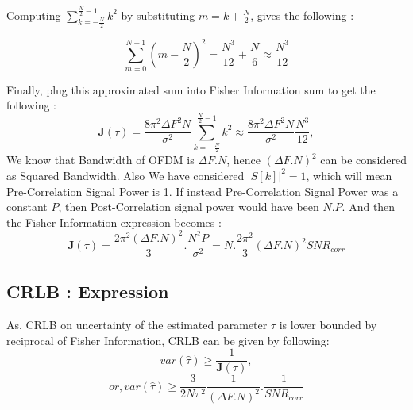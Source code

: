 \documentclass{article}
\begin{document}
Computing $\sum^{\frac{N}{2} - 1}_{k=-\frac{N}{2}}k^2$ by substituting $m=k+\frac{N}{2}$, gives the following :

$$\sum^{N-1}_{m=0}(m-\frac{N}{2})^2 = \frac{N^3}{12} + \frac{N}{6} \approx \frac{N^3}{12}$$

Finally, plug this approximated sum into Fisher Information sum to get the following :
$$\mathbf{J}(\tau) = \frac{8\pi^2 \Delta F^2 N}{\sigma^2}\sum^{\frac{N}{2} - 1}_{k=-\frac{N}{2}}k^2 \approx \frac{8\pi^2 \Delta F^2 N}{\sigma^2} \frac{N^3}{12},$$
We know that Bandwidth of OFDM is $\Delta F.N$, hence $(\Delta F . N)^2$ can be considered as Squared Bandwidth. Also We have considered $|S[k]|^2 = 1$, which will mean Pre-Correlation Signal Power is 1. If instead Pre-Correlation Signal Power was a constant $P$, then Post-Correlation signal power would have been $N.P$. And then the Fisher Information expression becomes :
$$\mathbf{J}(\tau) = \frac{2\pi^2 (\Delta F.N)^2}{3}. \frac{N^2 P}{\sigma^2} = N. \frac{2\pi^2}{3} (\Delta F.N)^2 SNR_{corr}$$

\subsection{CRLB : Expression}
As, CRLB on uncertainty of the estimated parameter $\tau$ is lower bounded by reciprocal of Fisher Information, CRLB can be given by following:
$$var(\hat{\tau}) \ge \frac{1}{\mathbf J(\tau)},$$
$$or, var(\hat{\tau}) \ge \frac{3}{2N\pi^2}\frac{1}{(\Delta F.N)^2}.\frac{1}{SNR_{corr}}$$

\appendix
\end{document}
